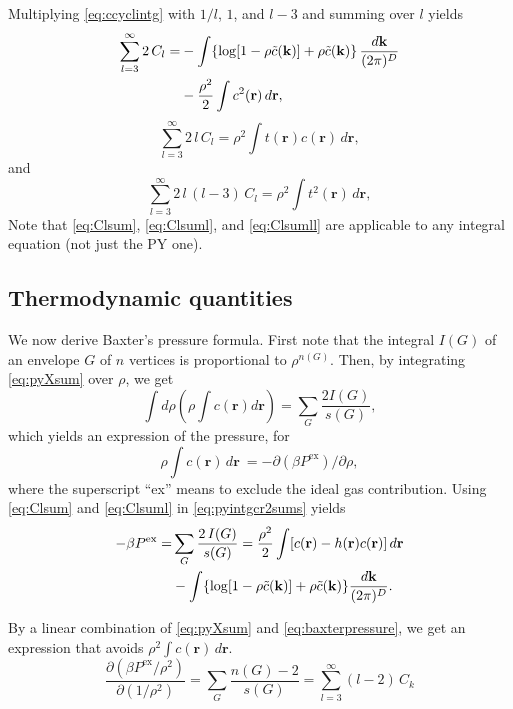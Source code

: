 \documentclass[aip,jcp,reprint,superscriptaddress]{revtex4-1}
\newcommand{\vct}[1]{\mathbf{#1}}
\providecommand{\vr}{} %
\renewcommand{\vr}{\vct{r}}
\newcommand{\vk}{\vct{k}}
\newcommand{\dvk}{\frac{d\vk}{(2\pi)^D}}
\newcommand{\supex}[1]{{#1}^{\mathrm{ex}}}
\newcommand{\Pex}{\supex{P}}
\begin{document}
Multiplying \eqref{eq:ccyclintg} with
  $1/l$, $1$, and $l-3$
  and summing over $l$ yields
%
\begin{align}
      \sum_{l=3}^{\infty} 2 \, C_l
  =& -\int \{ \log[ 1 - \rho \tilde{c}(\vk) ]
     + \rho \tilde{c}(\vk) \}\, \dvk
     \notag \\
   & - \frac{\rho^2}{2} \int c^2(\vr) \, d\vr,
\label{eq:Clsum}
\end{align}
%
\begin{equation}
    \sum_{l=3}^{\infty} 2 \, l \, C_l
  = \rho^2 \int t(\vr) c(\vr) \, d\vr,
\label{eq:Clsuml}
\end{equation}
%
and
%
\begin{equation}
    \sum_{l=3}^{\infty} 2 \, l \, (l - 3) \, C_l
  = \rho^2 \int t^2(\vr) \, d\vr,
\label{eq:Clsumll}
\end{equation}
%
Note that \eqref{eq:Clsum}, \eqref{eq:Clsuml}, and \eqref{eq:Clsumll}
  are applicable to any integral equation (not just the PY one).




\subsection*{Thermodynamic quantities}


We now derive Baxter's pressure formula\cite{baxterpressure}.
%
First note that
  the integral $I(G)$ of an envelope $G$ of $n$ vertices
  is proportional to $\rho^{n(G)}$.
%
Then, by integrating \eqref{eq:pyXsum} over $\rho$,
  we get
\[
    \int d\rho \left( \rho \int c(\vr) d\vr \right)
  = \sum_G \frac{ 2 I(G) }{ s(G) },
\]
%
which yields an expression of the pressure, for
%
\begin{equation}
    \rho \int c(\vr) \, d\vr \
  = -\partial (\beta P^{\mathrm{ex}}) / \partial \rho,
\label{eq:crcompr}
\end{equation}
%
where the superscript ``ex'' means to exclude the ideal gas contribution.
%
Using \eqref{eq:Clsum} and \eqref{eq:Clsuml}
  in \eqref{eq:pyintgcr2sums} yields
%
\begin{align}
      -\beta \Pex
  =&  \sum_{G} \frac{ 2 \, I(G) }{ s(G) }
  =   \frac{ \rho^2 }{ 2 }
      \int [c(\vr) - h(\vr) c(\vr)] \, d\vr \notag \\
  &
      -\int \{ \log[1 - \rho \tilde{c}(\vk)] + \rho \tilde{c}(\vk) \} \dvk.
\label{eq:baxterpressure}
\end{align}



By a linear combination of
  \eqref{eq:pyXsum} and \eqref{eq:baxterpressure},
  we get an expression that avoids
  $\rho^2 \int c(\vr) \, d\vr$.
%
\begin{equation}
    \frac{\partial (\beta \Pex/\rho^2) } {\partial (1/\rho^2)}
  = \sum_G \frac{ n(G) - 2 }{ s(G) }
  = \sum_{l = 3}^{\infty} (l - 2) \, C_k
\label{eq:pymixedpressure}
\end{equation}
%
\end{document}
